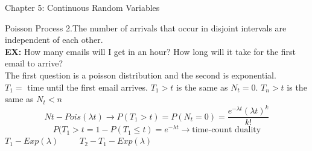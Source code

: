 \documentclass[a4paper, 12pt]{article}
\begin{document}
\begin{section}{Chapter 5: Continuous Random Variables}
\begin{subsection}{Poisson Process}
2.The number of arrivals that occur in disjoint intervals are independent of each other.\\
\textbf{EX:} How many emails will I get in an hour? How long will it take for the first email to arrive?\\
The first question is a poisson distribution and the second is exponential.\\
$T_1=$ time until the first email arrives. $T_1>t$ is the same as $N_{t}=0$. $T_{n}>t$ is the same as $N_{t}<n$\\
\begin{equation} 
Nt-Pois(\lambda t) \to P(T_1>t)=P(N_{t}=0)=\frac{e^{-\lambda t}(\lambda t)^{k}}{k!}
\end{equation}
\begin{equation} 
P(T_1>t=1-P(T_1\leq t)=e^{-\lambda t} \to \mbox{time-count duality}
\end{equation}
$T_1-Exp(\lambda)$~~~~~$T_2-T_1-Exp(\lambda)$
\end{subsection}
\end{section}
\end{document}
